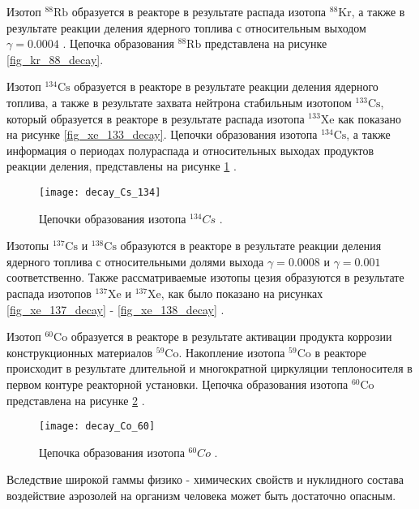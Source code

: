 Изотоп $^{88}\text{Rb}$ образуется в реакторе в результате распада изотопа $^{88}\text{Kr}$, а также в результате 
реакции деления ядерного топлива с относительным выходом $\gamma=0.0004$ \cite{gusev_bio}. Цепочка образования 
$^{88}\text{Rb}$ представлена на рисунке \ref{fig_kr_88_decay}.

Изотоп $^{134}\text{Cs}$ образуется в реакторе в результате реакции деления ядерного топлива, а также в результате 
захвата нейтрона стабильным изотопом $^{133}\text{Cs}$, который образуется в реакторе в результате распада изотопа 
$^{133}\text{Xe}$ как показано на рисунке \ref{fig_xe_133_decay}. Цепочки образования изотопа $^{134}\text{Cs}$, а также 
информация о периодах полураспада и относительных выходах продуктов реакции деления, представлены на рисунке 
\ref{fig_Cs_134_decay} \cite{gusev_bio}.

\begin{figure}[ht!]
    \centering
    \texttt{[image: decay\_Cs\_134]}
    \captionsetup{justification=centering}
    \caption{Цепочки образования изотопа $^{134}Cs$ \cite{periodic_table}.}
    \label{fig_Cs_134_decay}
\end{figure}

Изотопы $^{137}\text{Cs}$ и $^{138}\text{Cs}$ образуются в реакторе в результате реакции деления ядерного топлива с 
относительными долями выхода $\gamma=0.0008$ и $\gamma=0.001$ соответственно. Также рассматриваемые изотопы цезия 
образуются в результате распада изотопов $^{137}\text{Xe}$ и $^{137}\text{Xe}$, как было показано на рисунках 
\ref{fig_xe_137_decay} - \ref{fig_xe_138_decay} \cite{gusev_bio}.

Изотоп $^{60}\text{Co}$ образуется в реакторе в результате активации продукта коррозии конструкционных материалов 
$^{59}\text{Co}$. Накопление изотопа $^{59}\text{Co}$ в реакторе происходит в результате длительной и многократной 
циркуляции теплоносителя в первом контуре реакторной установки. Цепочка образования изотопа $^{60}\text{Co}$ 
представлена на рисунке \ref{fig_Co_60_decay} \cite{gusev_bio}.

\begin{figure}[ht!]
    \centering
    \texttt{[image: decay\_Co\_60]}
    \captionsetup{justification=centering}
    \caption{Цепочка образования изотопа $^{60}Co$ \cite{periodic_table}.}
    \label{fig_Co_60_decay}
\end{figure}

Вследствие широкой гаммы физико - химических свойств и нуклидного состава воздействие аэрозолей на организм человека 
может быть достаточно опасным. 

